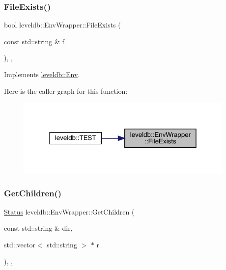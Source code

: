 \subsubsection{\texorpdfstring{FileExists()}{FileExists()}}
{\footnotesize\ttfamily bool leveldb\+::\+Env\+Wrapper\+::\+File\+Exists (\begin{DoxyParamCaption}\item[{const std\+::string \&}]{f }\end{DoxyParamCaption})\hspace{0.3cm}{\ttfamily [inline]}, {\ttfamily [override]}, {\ttfamily [virtual]}}



Implements \mbox{\hyperlink{classleveldb_1_1_env_acbb85047fdf7bf441bd365cfb09f9ecb}{leveldb\+::\+Env}}.

Here is the caller graph for this function\+:
\nopagebreak
\begin{figure}[H]
\begin{center}
\leavevmode
\includegraphics[width=303pt]{classleveldb_1_1_env_wrapper_ae046fc226c039a8eb5d00c59eb0f47ba_icgraph}
\end{center}
\end{figure}
\mbox{\label{classleveldb_1_1_env_wrapper_a5382cf15ad3a80c23f291238125d752d}} 
\subsubsection{\texorpdfstring{GetChildren()}{GetChildren()}}
{\footnotesize\ttfamily \mbox{\hyperlink{classleveldb_1_1_status}{Status}} leveldb\+::\+Env\+Wrapper\+::\+Get\+Children (\begin{DoxyParamCaption}\item[{const std\+::string \&}]{dir,  }\item[{std\+::vector$<$ std\+::string $>$ $\ast$}]{r }\end{DoxyParamCaption})\hspace{0.3cm}{\ttfamily [inline]}, {\ttfamily [override]}, {\ttfamily [virtual]}}




